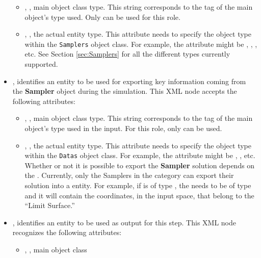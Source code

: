 \begin{itemize}
\begin{itemize}
  \item {}, , main object class
    type.
    This string corresponds to the tag of the main object's type used.
    Only  can be used for this role.
  \item {}, , the actual entity
    type.
    This attribute needs to specify the object type within the \texttt{Samplers}
    object class.
    For example, the  attribute might be ,
   , , etc.
    See Section \ref{sec:Samplers} for all the different types currently
    supported.
\end{itemize}
\item {},  identifies
an entity to be used for exporting key information coming from the
\textbf{Sampler} object during the simulation.
This XML node accepts the following attributes:
\begin{itemize}
  \item {}, , main object class
    type.
    This string corresponds to the tag of the main object's type used in the
    input.
    For this role, only  can be used.
  \item {}, , the actual entity
    type.
    This attribute needs to specify the object type within the \texttt{Datas} 
    object class.
    For example, the  attribute might be , 
    , etc. \\
    \nb Whether or not it is possible to export the \textbf{Sampler} solution
    depends on the .
    Currently, only the Samplers in the  category can
    export their solution into a  entity.
    For example, if   is of type , the 
     needs to be of type  and 
    it will contain the coordinates, in the input space, that belong to the
    ``Limit Surface.'' 
\end{itemize}
\item {},  identifies an
entity to be used as output for this step.
This XML node recognizes the following attributes:
\begin{itemize}
  \item {}, , main object class

\end{itemize}
\end{itemize}
